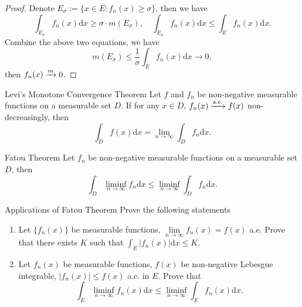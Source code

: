 \begin{proof}
  Denote $E_{\sigma} := \{x \in E: f_n(x) \geq \sigma\}$, then we have
  \begin{equation}
    \int_{E_{\sigma}}f_n(x)\mathrm{d} x \geq \sigma \cdot m (E_{\sigma}), \quad
    \int_{E_{\sigma}}f_n(x) \mathrm{d} x \leq \int_E f_n(x) \mathrm{d} x.
  \end{equation}
  Combine the above two equations, we have
  \begin{equation}
    m(E_{\sigma}) \leq \frac{1}{\sigma} \int_E f_n(x)\mathrm{d} x \rightarrow 0,
  \end{equation}
  then $f_n(x) \xrightarrow{m} 0$.
\end{proof}

\begin{theorem}{Levi's Monotone Convergence Theorem}{}
  Let $f$ and $f_n$ be non-negative measurable functions on a measurable set
  $D$.
  If for any $x \in D$, $f_n(x) \xrightarrow{\text{a.e.}} f(x)$ non-decreasingly, then
  \begin{equation}
    \int_D f(x)\mathrm{d} x = \lim \limits _{n \rightarrow \infty} \int_D f_n\mathrm{d} x.
  \end{equation}
\end{theorem}

\begin{theorem}{Fatou Theorem}{}
  Let $f_n$ be non-negative measurable functions on a measurable set $D$,
  then
  \begin{equation}
    \int_D \liminf \limits_{n \rightarrow \infty} f_n\mathrm{d} x
    \leq \liminf \limits_{n \rightarrow \infty} \int_D f_n\mathrm{d} x.
  \end{equation}
\end{theorem}

\begin{example}{Applications of Fatou Theorem}{}
  Prove the following statements
  \begin{enumerate}
  \item Let $\{f_n(x)\}$ be measurable functions, $\lim \limits _{n \rightarrow \infty} f_n(x) = f(x)$ a.e.
    Prove that there exists $K$ such that $\int_E |f_n(x)| \mathrm{d} x \leq K$.
  \item Let $f_n(x)$ be measurable functions, $f(x)$ be non-negative Lebesgue integrable,
    $|f_n(x)| \leq f(x)$ a.e. in $E$. Prove that
    \begin{equation}
      \int_E \liminf_{n \rightarrow \infty} f_n(x) \mathrm{d} x \leq \liminf _{n \rightarrow \infty} \int_E f_n(x)\mathrm{d} x.
    \end{equation}
  \end{enumerate}
\end{example}

